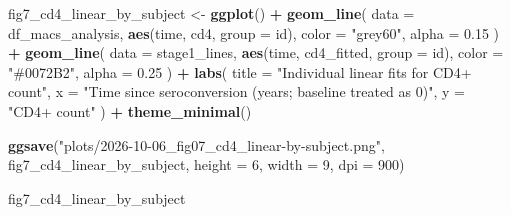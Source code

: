 \documentclass[
]{article}
\newenvironment{Shaded}{\begin{snugshade}}{\end{snugshade}}
\newcommand{\AttributeTok}[1]{\textcolor[rgb]{0.13,0.29,0.53}{#1}}
\newcommand{\ControlFlowTok}[1]{\textcolor[rgb]{0.13,0.29,0.53}{\textbf{#1}}}
\newcommand{\DecValTok}[1]{\textcolor[rgb]{0.00,0.00,0.81}{#1}}
\newcommand{\FloatTok}[1]{\textcolor[rgb]{0.00,0.00,0.81}{#1}}
\newcommand{\FunctionTok}[1]{\textcolor[rgb]{0.13,0.29,0.53}{\textbf{#1}}}
\newcommand{\NormalTok}[1]{#1}
\newcommand{\OtherTok}[1]{\textcolor[rgb]{0.56,0.35,0.01}{#1}}
\newcommand{\SpecialCharTok}[1]{\textcolor[rgb]{0.81,0.36,0.00}{\textbf{#1}}}
\newcommand{\StringTok}[1]{\textcolor[rgb]{0.31,0.60,0.02}{#1}}
\begin{document}
\begin{Shaded}
\end{Shaded}

\begin{Shaded}
\begin{Highlighting}[]
\NormalTok{fig7\_cd4\_linear\_by\_subject }\OtherTok{\textless{}{-}} 
  \FunctionTok{ggplot}\NormalTok{() }\SpecialCharTok{+}
  \FunctionTok{geom\_line}\NormalTok{(}
    \AttributeTok{data =}\NormalTok{ df\_macs\_analysis,}
    \FunctionTok{aes}\NormalTok{(time, cd4, }\AttributeTok{group =}\NormalTok{ id),}
    \AttributeTok{color =} \StringTok{"grey60"}\NormalTok{, }\AttributeTok{alpha =} \FloatTok{0.15}
\NormalTok{  ) }\SpecialCharTok{+}
  \FunctionTok{geom\_line}\NormalTok{(}
    \AttributeTok{data =}\NormalTok{ stage1\_lines,}
    \FunctionTok{aes}\NormalTok{(time, cd4\_fitted, }\AttributeTok{group =}\NormalTok{ id),}
    \AttributeTok{color =} \StringTok{"\#0072B2"}\NormalTok{, }\AttributeTok{alpha =} \FloatTok{0.25}
\NormalTok{  ) }\SpecialCharTok{+}
  \FunctionTok{labs}\NormalTok{(}
    \AttributeTok{title =} \StringTok{"Individual linear fits for CD4+ count"}\NormalTok{,}
    \AttributeTok{x =} \StringTok{"Time since seroconversion (years; baseline treated as 0)"}\NormalTok{,}
    \AttributeTok{y =} \StringTok{"CD4+ count"}
\NormalTok{  ) }\SpecialCharTok{+}
  \FunctionTok{theme\_minimal}\NormalTok{()}

\FunctionTok{ggsave}\NormalTok{(}\StringTok{"plots/2026{-}10{-}06\_fig07\_cd4\_linear{-}by{-}subject.png"}\NormalTok{, }
\NormalTok{       fig7\_cd4\_linear\_by\_subject, }\AttributeTok{height =} \DecValTok{6}\NormalTok{, }\AttributeTok{width =} \DecValTok{9}\NormalTok{, }\AttributeTok{dpi =} \DecValTok{900}\NormalTok{)}

\NormalTok{fig7\_cd4\_linear\_by\_subject}
\end{Highlighting}
\end{Shaded}
\end{document}
